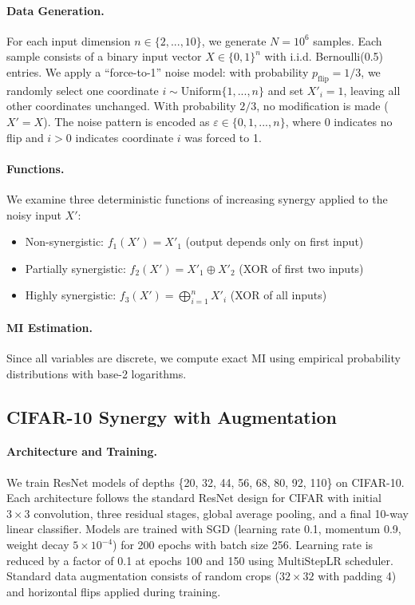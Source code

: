 \documentclass{article}
\theoremstyle{definition}
\theoremstyle{remark}
\begin{document}
\paragraph{Data Generation.} For each input dimension $n \in \{2, ..., 10\}$, we generate $N = 10^6$ samples. Each sample consists of a binary input vector $X \in \{0,1\}^n$ with i.i.d. Bernoulli(0.5) entries. We apply a ``force-to-1'' noise model: with probability $p_{\text{flip}} = 1/3$, we randomly select one coordinate $i \sim \text{Uniform}\{1,...,n\}$ and set $X'_i = 1$, leaving all other coordinates unchanged. With probability $2/3$, no modification is made ($X' = X$). The noise pattern is encoded as $\varepsilon \in \{0, 1, ..., n\}$, where 0 indicates no flip and $i > 0$ indicates coordinate $i$ was forced to 1.

\paragraph{Functions.} We examine three deterministic functions of increasing synergy applied to the noisy input $X'$:
\begin{itemize}
    \item Non-synergistic: $f_1(X') = X'_1$ (output depends only on first input)
    \item Partially synergistic: $f_2(X') = X'_1 \oplus X'_2$ (XOR of first two inputs)
    \item Highly synergistic: $f_3(X') = \bigoplus_{i=1}^n X'_i$ (XOR of all inputs)
\end{itemize}

\paragraph{MI Estimation.} Since all variables are discrete, we compute exact MI using empirical probability distributions with base-2 logarithms. 

\subsection{CIFAR-10 Synergy with Augmentation}
\label{app:cifar_synergy}

\paragraph{Architecture and Training.} We train ResNet models of depths \{20, 32, 44, 56, 68, 80, 92, 110\} on CIFAR-10. Each architecture follows the standard ResNet design for CIFAR with initial $3\times3$ convolution, three residual stages, global average pooling, and a final 10-way linear classifier. Models are trained with SGD (learning rate 0.1, momentum 0.9, weight decay $5 \times 10^{-4}$) for 200 epochs with batch size 256. Learning rate is reduced by a factor of 0.1 at epochs 100 and 150 using MultiStepLR scheduler. Standard data augmentation consists of random crops ($32\times32$ with padding 4) and horizontal flips applied during training.
\end{document}
